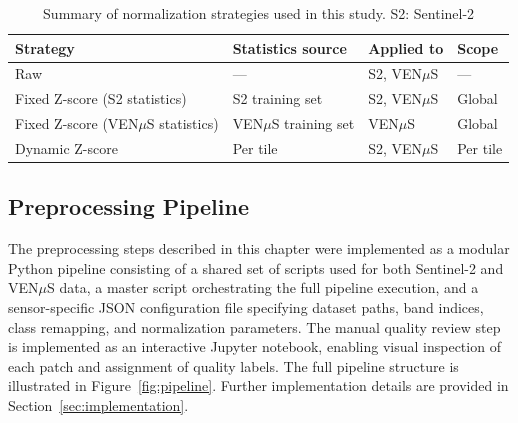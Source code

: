 \begin{table}[H]
\centering
\caption[Summary of normalization strategies used in 
this study.]{Summary of normalization strategies used in 
this study. S2: Sentinel-2}
\label{tab:normalization}
\small
\begin{tabular}{llll}
\toprule
\textbf{Strategy} & \textbf{Statistics source} & 
\textbf{Applied to} & \textbf{Scope} \\
\midrule
Raw & — & S2, VEN$\mu$S & — \\
Fixed Z-score (S2 statistics) & S2 training set & S2, VEN$\mu$S & 
Global \\
Fixed Z-score (VEN$\mu$S statistics) & VEN$\mu$S training set & 
VEN$\mu$S & Global \\
Dynamic Z-score & Per tile & S2, VEN$\mu$S & Per tile \\
\bottomrule
\end{tabular}
\end{table}

\subsection{Preprocessing Pipeline}
\label{sec:pipeline}

The preprocessing steps described in this chapter were implemented as a modular Python pipeline consisting of a shared set of scripts used for both Sentinel-2 and VEN$\mu$S data, a master script orchestrating the full pipeline execution, and a sensor-specific JSON configuration file specifying dataset paths, band indices, class remapping, and normalization parameters. The manual quality review step is implemented as an interactive Jupyter notebook, enabling visual inspection of each patch and assignment of quality labels. The full pipeline structure is illustrated in Figure~\ref{fig:pipeline}. Further implementation details are provided in Section~\ref{sec:implementation}.


